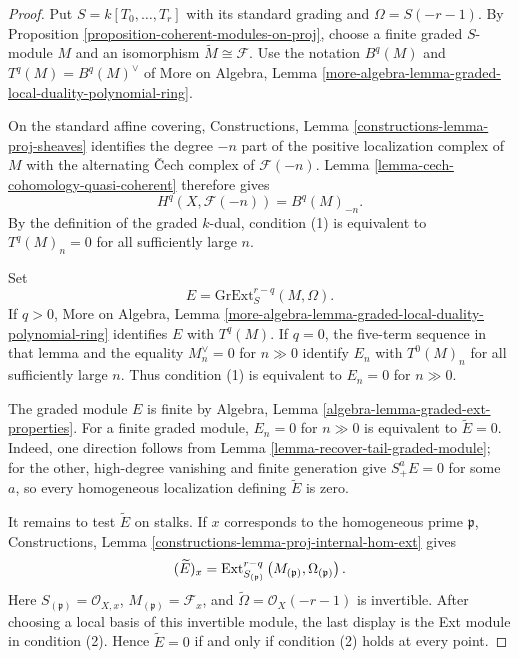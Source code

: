 \begin{proof}
Put $S=k[T_0,\ldots,T_r]$ with its standard grading and
$\Omega=S(-r-1)$. By Proposition
\ref{proposition-coherent-modules-on-proj}, choose a finite graded
$S$-module $M$ and an isomorphism $\widetilde M\cong\mathcal{F}$.
Use the notation $B^q(M)$ and $T^q(M)=B^q(M)^\vee$ of More on Algebra,
Lemma \ref{more-algebra-lemma-graded-local-duality-polynomial-ring}.

On the standard affine covering, Constructions, Lemma
\ref{constructions-lemma-proj-sheaves} identifies the degree $-n$ part
of the positive localization complex of $M$ with the alternating
{\v C}ech complex of $\mathcal{F}(-n)$. Lemma
\ref{lemma-cech-cohomology-quasi-coherent} therefore gives
$$
H^q(X,\mathcal{F}(-n))=B^q(M)_{-n}.
$$
By the definition of the graded $k$-dual, condition (1) is equivalent to
$T^q(M)_n=0$ for all sufficiently large $n$.

Set
$$
E=\text{GrExt}^{r-q}_S(M,\Omega).
$$
If $q>0$, More on Algebra, Lemma
\ref{more-algebra-lemma-graded-local-duality-polynomial-ring}
identifies $E$ with $T^q(M)$. If $q=0$, the five-term sequence in that
lemma and the equality $M^\vee_n=0$ for $n\gg0$ identify
$E_n$ with $T^0(M)_n$ for all sufficiently large $n$. Thus condition
(1) is equivalent to $E_n=0$ for $n\gg0$.

The graded module $E$ is finite by Algebra, Lemma
\ref{algebra-lemma-graded-ext-properties}. For a finite graded module,
$E_n=0$ for $n\gg0$ is equivalent to $\widetilde E=0$. Indeed, one
direction follows from Lemma \ref{lemma-recover-tail-graded-module};
for the other, high-degree vanishing and finite generation give
$S_+^aE=0$ for some $a$, so every homogeneous localization defining
$\widetilde E$ is zero.

It remains to test $\widetilde E$ on stalks. If $x$ corresponds to the
homogeneous prime $\mathfrak p$, Constructions, Lemma
\ref{constructions-lemma-proj-internal-hom-ext} gives
$$
(\widetilde E)_x
=
\mathop{\mathrm{Ext}}\nolimits^{r-q}_{S_{(\mathfrak p)}}
\left(M_{(\mathfrak p)},\Omega_{(\mathfrak p)}\right).
$$
Here $S_{(\mathfrak p)}=\mathcal{O}_{X,x}$,
$M_{(\mathfrak p)}=\mathcal{F}_x$, and
$\widetilde\Omega=\mathcal{O}_X(-r-1)$ is invertible. After choosing a
local basis of this invertible module, the last display is the Ext module
in condition (2). Hence $\widetilde E=0$ if and only if condition (2)
holds at every point.
\end{proof}

